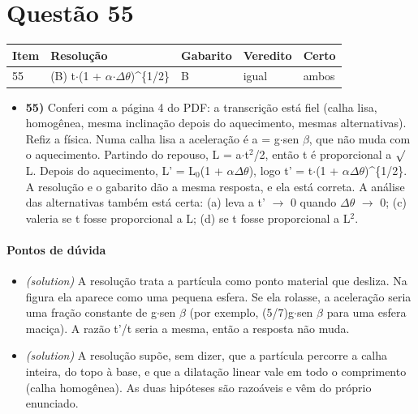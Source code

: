 \documentclass{article}%
\begin{document}
\section*{Questão 55}%
\begin{longtable}{@{}p{} p{} p{} p{} p{}@{}}\toprule Item & Resolução & Gabarito & Veredito & Certo \\ \midrule
55 & (B) t$\cdot$(1 + $\alpha$$\cdot$$\Delta$$\theta$)\^{}\{1/2\} & B & igual & ambos \\
\bottomrule\end{longtable}%
\begin{itemize}%
\item%
\textbf{55)} Conferi com a página 4 do PDF: a transcrição está fiel (calha lisa, homogênea, mesma inclinação depois do aquecimento, mesmas alternativas). Refiz a física. Numa calha lisa a aceleração é a = g$\cdot$sen $\beta$, que não muda com o aquecimento. Partindo do repouso, L = a$\cdot$t$^2$/2, então t é proporcional a $\surd$L. Depois do aquecimento, L' = L$_{0}$(1 + $\alpha$$\Delta$$\theta$), logo t' = t$\cdot$(1 + $\alpha$$\Delta$$\theta$)\^{}\{1/2\}. A resolução e o gabarito dão a mesma resposta, e ela está correta. A análise das alternativas também está certa: (a) leva a t' $\to$ 0 quando $\Delta$$\theta$ $\to$ 0; (c) valeria se t fosse proporcional a L; (d) se t fosse proporcional a L$^2$.%
\end{itemize}%
\paragraph{Pontos de dúvida}%
\begin{itemize}%
\item%
\textit{(solution)} A resolução trata a partícula como ponto material que desliza. Na figura ela aparece como uma pequena esfera. Se ela rolasse, a aceleração seria uma fração constante de g$\cdot$sen $\beta$ (por exemplo, (5/7)g$\cdot$sen $\beta$ para uma esfera maciça). A razão t'/t seria a mesma, então a resposta não muda.%
\item%
\textit{(solution)} A resolução supõe, sem dizer, que a partícula percorre a calha inteira, do topo à base, e que a dilatação linear vale em todo o comprimento (calha homogênea). As duas hipóteses são razoáveis e vêm do próprio enunciado.%
\end{itemize}%
\end{document}
